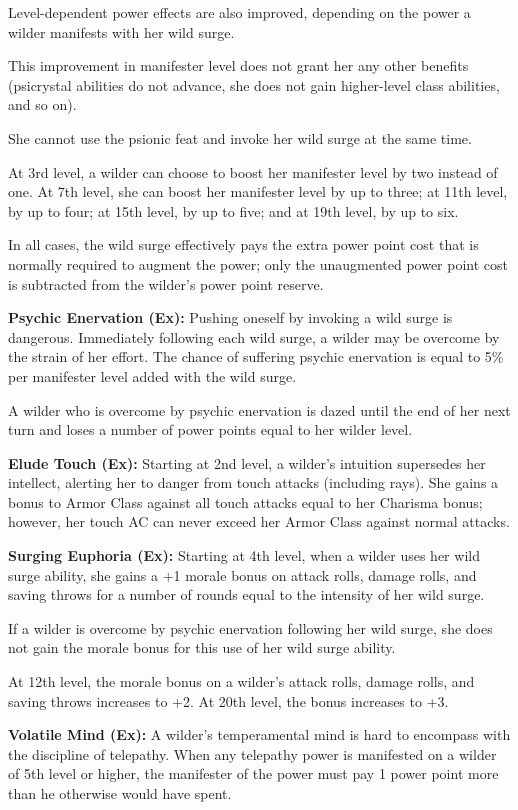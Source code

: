 Level-dependent power effects are also improved, depending on the power a wilder manifests with her wild surge.

This improvement in manifester level does not grant her any other benefits (psicrystal abilities do not advance, she does not gain higher-level class abilities, and so on).

She cannot use the  psionic feat and invoke her wild surge at the same time.

At 3rd level, a wilder can choose to boost her manifester level by two instead of one. At 7th level, she can boost her manifester level by up to three; at 11th level, by up to four; at 15th level, by up to five; and at 19th level, by up to six.

In all cases, the wild surge effectively pays the extra power point cost that is normally required to augment the power; only the unaugmented power point cost is subtracted from the wilder's power point reserve.

\textbf{Psychic Enervation (Ex):} Pushing oneself by invoking a wild surge is dangerous. Immediately following each wild surge, a wilder may be overcome by the strain of her effort. The chance of suffering psychic enervation is equal to 5\% per manifester level added with the wild surge.

A wilder who is overcome by psychic enervation is dazed until the end of her next turn and loses a number of power points equal to her wilder level.

\textbf{Elude Touch (Ex):} Starting at 2nd level, a wilder's intuition supersedes her intellect, alerting her to danger from touch attacks (including rays). She gains a bonus to Armor Class against all touch attacks equal to her Charisma bonus; however, her touch AC can never exceed her Armor Class against normal attacks.

\textbf{Surging Euphoria (Ex):} Starting at 4th level, when a wilder uses her wild surge ability, she gains a +1 morale bonus on attack rolls, damage rolls, and saving throws for a number of rounds equal to the intensity of her wild surge.

If a wilder is overcome by psychic enervation following her wild surge, she does not gain the morale bonus for this use of her wild surge ability.

At 12th level, the morale bonus on a wilder's attack rolls, damage rolls, and saving throws increases to +2. At 20th level, the bonus increases to +3.

\textbf{Volatile Mind (Ex):} A wilder's temperamental mind is hard to encompass with the discipline of telepathy. When any telepathy power is manifested on a wilder of 5th level or higher, the manifester of the power must pay 1 power point more than he otherwise would have spent.

